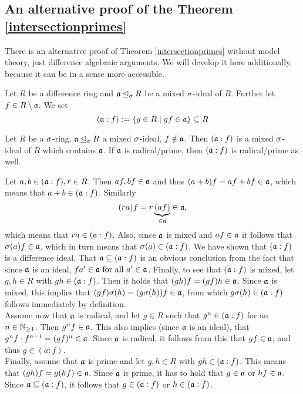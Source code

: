 \subsection{An alternative proof of the Theorem \ref{intersectionprimes}}

There is an alternative proof of Theorem \ref{intersectionprimes} without model theory, just difference algebraic arguments. We will develop it here additionally, because it can be in a sense more accessible.

\begin{defn}
Let $R$ be a difference ring and $\mathfrak{a} \unlhd_{\sigma} R$ be a mixed $\sigma$-ideal of $R$. Further let $f \in R \setminus \mathfrak{a}$. We set $$(\mathfrak{a}:f):= \{ g \in R \mid gf \in \mathfrak{a} \} \subseteq R$$
\end{defn}

\begin{lem}
Let $R$ be a $\sigma$-ring, $\mathfrak{a} \unlhd_{\sigma} R$ a mixed $\sigma$-ideal, $f \notin \mathfrak{a}$. Then $(\mathfrak{a}:f)$ is a mixed $\sigma$-ideal of $R$ which contains $\mathfrak{a}$. If $\mathfrak{a}$ is radical/prime, then $(\mathfrak{a}:f)$ is radical/prime as well.
\begin{bew}
Let $a,b \in (\mathfrak{a}:f), r \in R$. Then $af, bf \in \mathfrak{a}$ and thus $(a + b)f = af + bf \in \mathfrak{a}$, which means that $a + b \in (\mathfrak{a}:f)$. Similarly $$(ra)f = r\underbrace{(af)}_{\in \mathfrak{a}} \in \mathfrak{a},$$
which means that $ra \in (\mathfrak{a}:f)$. Also, since $\mathfrak{a}$ is mixed and $af \in \mathfrak{a}$ it follows that $\sigma(a)f \in \mathfrak{a}$, which in turn means that $\sigma(a) \in (\mathfrak{a}:f)$. We have shown that $(\mathfrak{a}:f)$ is a difference ideal. 
That $\mathfrak{a} \subseteq (\mathfrak{a}:f)$ is an obvious conclusion from the fact that since $\mathfrak{a}$ is an ideal, $fa' \in \mathfrak{a} \text{ for all } a' \in \mathfrak{a}$.  Finally, to see that $(\mathfrak{a}:f)$ is mixed,
let $g,h \in R$ with $gh \in (\mathfrak{a}:f)$. Then it holds that $(gh)f = (gf)h  \in \mathfrak{a}$. Since $\mathfrak{a}$ is mixed, this implies that $(gf)\sigma(h) = (g\sigma(h))f \in \mathfrak{a}$, from which $g\sigma(h) \in (\mathfrak{a}:f)$ follows immediately by definition. \\
\indent Assume now that $\mathfrak{a}$ is radical, and let $g \in R$ such that $g^n \in (\mathfrak{a}:f)$ for an $n \in \mathbb{N}_{\geq1}$. Then $g^nf \in \mathfrak{a}$. This also implies (since $\mathfrak{a}$ is an ideal), that $g^nf \cdot f^{n-1} = (gf)^n \in \mathfrak{a}$.
Since $\mathfrak{a}$ is radical, it follows from this that $gf \in \mathfrak{a}$, and thus $g \in (a:f)$.\\ 
\indent Finally, assume that $\mathfrak{a}$ is prime and let $g, h \in R$ with $gh \in (\mathfrak{a}:f)$. This means that $(gh)f = g(hf) \in \mathfrak{a}$. Since $\mathfrak{a}$ is prime, it has to hold that $g \in \mathfrak{a}$ or $hf \in \mathfrak{a}$. Since $\mathfrak{a} \subseteq (\mathfrak{a}:f)$, it follows that $g \in (\mathfrak{a}:f)$ or $h \in (\mathfrak{a}:f)$.
\end{bew}
\end{lem}

